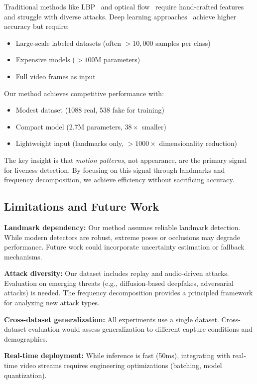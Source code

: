 \documentclass{article}
\begin{document}
Traditional methods like LBP~\citep{maatta2011face} and optical flow~\citep{kollreider2007evaluating} require hand-crafted features and struggle with diverse attacks. Deep learning approaches~\citep{liu2018learning, george2019deep} achieve higher accuracy but require:
\begin{itemize}
    \item Large-scale labeled datasets (often $>10,000$ samples per class)
    \item Expensive models ($>100$M parameters)
    \item Full video frames as input
\end{itemize}

Our method achieves competitive performance with:
\begin{itemize}
    \item Modest dataset (1088 real, 538 fake for training)
    \item Compact model (2.7M parameters, $38\times$ smaller)
    \item Lightweight input (landmarks only, $>1000\times$ dimensionality reduction)
\end{itemize}

The key insight is that \emph{motion patterns}, not appearance, are the primary signal for liveness detection. By focusing on this signal through landmarks and frequency decomposition, we achieve efficiency without sacrificing accuracy.

\subsection{Limitations and Future Work}

\textbf{Landmark dependency:} Our method assumes reliable landmark detection. While modern detectors are robust, extreme poses or occlusions may degrade performance. Future work could incorporate uncertainty estimation or fallback mechanisms.

\textbf{Attack diversity:} Our dataset includes replay and audio-driven attacks. Evaluation on emerging threats (e.g., diffusion-based deepfakes, adversarial attacks) is needed. The frequency decomposition provides a principled framework for analyzing new attack types.

\textbf{Cross-dataset generalization:} All experiments use a single dataset. Cross-dataset evaluation would assess generalization to different capture conditions and demographics.

\textbf{Real-time deployment:} While inference is fast (50ms), integrating with real-time video streams requires engineering optimizations (batching, model quantization).
\end{document}
